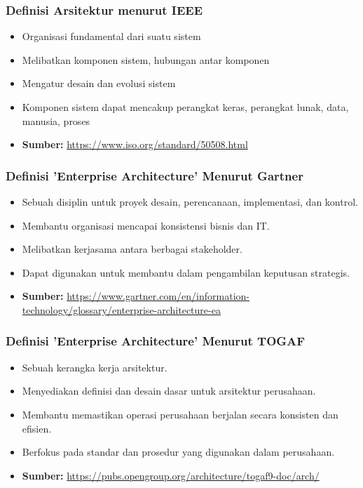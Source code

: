 \documentclass{beamer}
\begin{document}
	\begin{frame}
		\frametitle{Definisi Arsitektur menurut IEEE}
		\begin{itemize}
			\item Organisasi fundamental dari suatu sistem
			\item Melibatkan komponen sistem, hubungan antar komponen
			\item Mengatur desain dan evolusi sistem
			\item Komponen sistem dapat mencakup perangkat keras, perangkat lunak, data, manusia, proses
			\item \textbf{Sumber:} \url{https://www.iso.org/standard/50508.html}
		\end{itemize}
	\end{frame}
	
	
	
	\begin{frame}
		\frametitle{Definisi 'Enterprise Architecture' Menurut Gartner}
		\begin{itemize}
			\item Sebuah disiplin untuk proyek desain, perencanaan, implementasi, dan kontrol.
			\item Membantu organisasi mencapai konsistensi bisnis dan IT.
			\item Melibatkan kerjasama antara berbagai stakeholder.
			\item Dapat digunakan untuk membantu dalam pengambilan keputusan strategis.
			\item \textbf{Sumber:} \url{https://www.gartner.com/en/information-technology/glossary/enterprise-architecture-ea}
		\end{itemize}
	\end{frame}
	
	\begin{frame}
		\frametitle{Definisi 'Enterprise Architecture' Menurut TOGAF}
		\begin{itemize}
			\item Sebuah kerangka kerja arsitektur.
			\item Menyediakan definisi dan desain dasar untuk arsitektur perusahaan.
			\item Membantu memastikan operasi perusahaan berjalan secara konsisten dan efisien.
			\item Berfokus pada standar dan prosedur yang digunakan dalam perusahaan.
			\item \textbf{Sumber:} \url{https://pubs.opengroup.org/architecture/togaf9-doc/arch/}
		\end{itemize}
	\end{frame}
	
\end{document}
